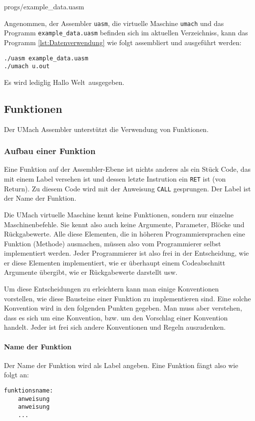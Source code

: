 
{progs/example_data.uasm}

Angenommen, der Assembler \texttt{uasm}, die virtuelle Maschine
\texttt{umach} und das Programm \texttt{example\_data.uasm} befinden sich im
aktuellen Verzeichniss, kann das Programm \ref{lst:Datenverwendung}  wie folgt
assembliert und ausgeführt werden:
\begin{lstlisting}
./uasm example_data.uasm
./umach u.out
\end{lstlisting}
Es wird lediglig \glqq Hallo Welt\grqq\ ausgegeben.



\subsection{Funktionen}

Der UMach Assembler unterstützt die Verwendung von Funktionen.

\subsubsection{Aufbau einer Funktion}

Eine Funktion auf der Assembler-Ebene ist nichts anderes als ein Stück Code,
das mit einem Label versehen ist und dessen letzte Instrution ein \texttt{RET}
ist (von Return). Zu diesem Code wird mit der Anweisung \texttt{CALL}
gesprungen. Der Label ist der Name der Funktion.

Die UMach virtuelle Maschine kennt keine Funktionen, sondern nur einzelne
Maschinenbefehle. Sie kennt also auch keine Argumente, Parameter, Blöcke und
Rückgabewerte. Alle diese Elementen, die in höheren Programmiersprachen eine
Funktion (Methode) ausmachen, müssen also vom Programmierer selbst implementiert
werden. Jeder Programmierer ist also frei in der Entscheidung, wie er diese
Elementen implementiert, wie er überhaupt einem Codeabschnitt Argumente
übergibt, wie er Rückgabewerte darstellt usw. 

Um diese Entscheidungen zu erleichtern kann man einige Konventionen vorstellen,
wie diese Bausteine einer Funktion zu implementieren sind. Eine solche
Konvention wird in den folgenden Punkten gegeben. Man muss aber verstehen, dass
es sich um eine Konvention, bzw. um den Vorschlag einer Konvention handelt.
Jeder ist frei sich andere Konventionen und Regeln auszudenken.

\paragraph{Name der Funktion}
Der Name der Funktion wird als Label angeben. Eine Funktion fängt also wie folgt
an:
\begin{lstlisting}
funktionsname:
    anweisung
    anweisung
    ...
\end{lstlisting}


